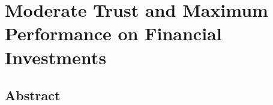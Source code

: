 \chapter{Moderate Trust and Maximum Performance on Financial Investments}
\label{chap:trust-returns}

\begingroup
\singlespacing
\section*{Abstract}

\endgroup







